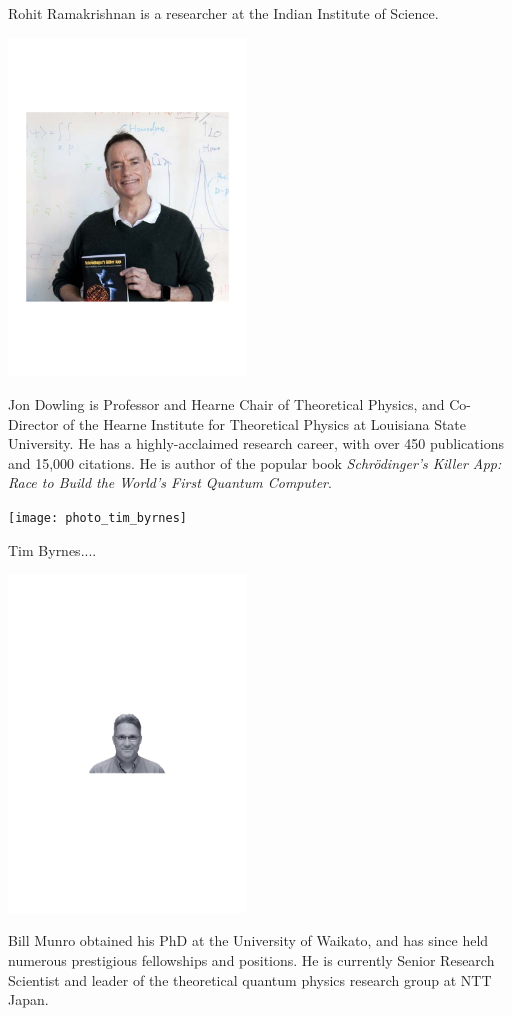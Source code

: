 Rohit Ramakrishnan is a researcher at the Indian Institute of Science.


%
%

\begin{center}
\includegraphics[clip=true, width=0.475\textwidth]{photo_jon_dowling}
\end{center}

Jon Dowling is Professor and Hearne Chair of Theoretical Physics, and Co-Director of the Hearne Institute for Theoretical Physics at Louisiana State University. He has a highly-acclaimed research career, with over 450 publications and 15,000 citations. He is author of the popular book \textit{Schr\"odinger's Killer App: Race to Build the World's First Quantum Computer}.


%
%

\begin{center}
\texttt{[image: photo\_tim\_byrnes]}
\end{center}

Tim Byrnes....


%
%

\begin{center}
\includegraphics[clip=true, width=0.475\textwidth]{photo_bill_munro}
\end{center}

Bill Munro obtained his PhD at the University of Waikato, and has since held numerous prestigious fellowships and positions. He is currently Senior Research Scientist and leader of the theoretical quantum physics research group at NTT Japan.


